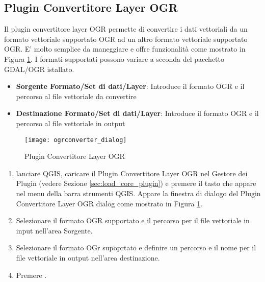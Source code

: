 
\subsection{Plugin Convertitore Layer OGR}


Il plugin convertitore layer OGR permette di convertire i dati vettoriali da un formato vettoriale supportato  OGR ad un altro formato vettoriale supportato  OGR. E' molto semplice da maneggiare e offre funzionalità come mostrato in Figura \ref{fig:ogrconverter_dialog}. I formati supportati possono variare a seconda del pacchetto GDAL/OGR istallato.


\begin{itemize}
\item \textbf{Sorgente Formato/Set di dati/Layer}: Introduce il formato OGR e il percorso al file vettoriale da convertire
\item \textbf{Destinazione Formato/Set di dati/Layer}: Introduce il formato OGR e il percorso al file vettoriale in output
\end{itemize}

\begin{figure}[ht]
   \begin{center}
   \caption{Plugin Convertitore Layer OGR \nixcaption}\label{fig:ogrconverter_dialog}\smallskip
   \texttt{[image: ogrconverter\_dialog]}
\end{center}  
\end{figure}

\begin{enumerate}
  \item lanciare QGIS, caricare il Plugin Convertitore Layer OGR nel Gestore dei Plugin (vedere Sezione 
  \ref{sec:load_core_plugin}) e premere il tasto  che appare nel menu della barra strumenti QGIS. Appare la finestra di dialogo del Plugin Convertitore Layer OGR dialog come mostrato in Figura \ref{fig:ogrconverter_dialog}.
  \item Selezionare il formato OGR supportato  e il percorso per il file vettoriale in input  nell'area Sorgente.
  \item Selezionare il formato OGr supoprtato  e definire un percorso e il nome per il file vettoriale in output  nell'area destinazione.
  \item Premere .
\end{enumerate}

\newpage



